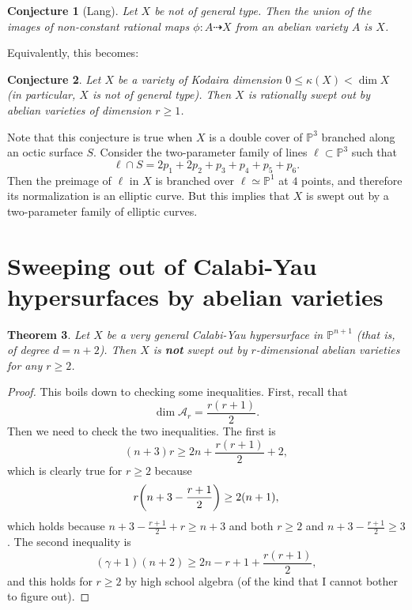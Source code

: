 \documentclass{amsart}
\newtheorem{thm}{Theorem}[section]
\newtheorem{conj}[thm]{Conjecture}
\theoremstyle{definition}
\theoremstyle{remark}
\theoremstyle{plain}
\theoremstyle{definition}
\theoremstyle{remark}
\renewcommand{\P}{\mathbb{P}}
\newcommand{\mc}[1]{\mathcal{#1}}
\newcommand{\1}{\mathbf{1}}
\newcommand{\2}{\mathbf{2}}
\newcommand{\3}{\mathbf{3}}
\begin{document}
\begin{conj}[Lang]
    Let $X$ be not of general type. Then the union of the images of non-constant rational maps $\phi \colon A \dashrightarrow X$ from an abelian variety $A$ is $X$.
\end{conj}

Equivalently, this becomes:

\begin{conj}
    Let $X$ be a variety of Kodaira dimension $0 \leq \kappa(X) < \dim X$ (in particular, $X$ is not of general type). Then $X$ is rationally swept out by abelian varieties of dimension $r \geq 1$.
\end{conj}

Note that this conjecture is true when $X$ is a double cover of $\P^3$ branched along an octic surface $S$. Consider the two-parameter family of lines $\ell \subset \P^3$ such that
\[ \ell \cap S = 2 p_1 + 2 p_2 + p_3 + p_4 + p_5 + p_6. \]
Then the preimage of $\ell$ in $X$ is branched over $\ell \simeq \P^1$ at $4$ points, and therefore its normalization is an elliptic curve. But this implies that $X$ is swept out by a two-parameter family of elliptic curves.

\section{Sweeping out of Calabi-Yau hypersurfaces by abelian varieties}

\begin{thm}
    Let $X$ be a very general Calabi-Yau hypersurface in $\P^{n+1}$ (that is, of degree $d = n+2$). Then $X$ is \textbf{not} swept out by $r$-dimensional abelian varieties for any $r \geq 2$.
\end{thm}

\begin{proof}
    This boils down to checking some inequalities. First, recall that
    \[ \dim \mc{A}_r = \frac{r(r+1)}{2}. \]
    Then we need to check the two inequalities. The first is
    \[ (n+3)r \geq 2n + \frac{r(r+1)}{2} + 2, \]
    which is clearly true for $r \geq 2$ because
    \begin{align*}
        r\qty(n+3-\frac{r+1}{2}) \geq 2(n+1),
    \end{align*}
    which holds because $n + 3 - \frac{r+1}{2} + r \geq n+3$ and both $r \geq 2$ and $n+3-\frac{r+1}{2} \geq 3$. The second inequality is
    \[ (\gamma + 1)(n+2) \geq 2n - r + 1 + \frac{r(r+1)}{2}, \]
    and this holds for $r \geq 2$ by high school algebra (of the kind that I cannot bother to figure out).
\end{proof}
\end{document}
